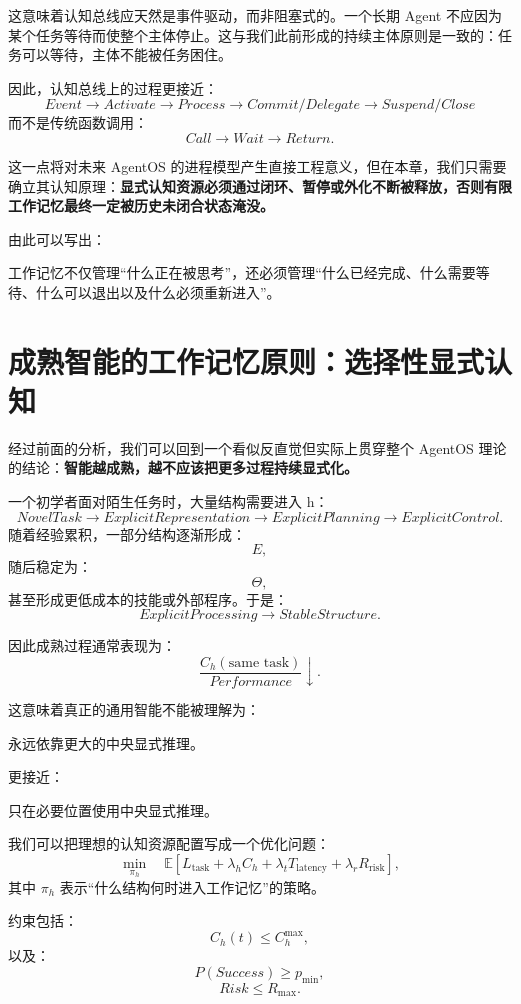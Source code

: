 这意味着认知总线应天然是事件驱动，而非阻塞式的。一个长期 Agent 不应因为某个任务等待而使整个主体停止。这与我们此前形成的持续主体原则是一致的：任务可以等待，主体不能被任务困住。

因此，认知总线上的过程更接近：
\[
Event
\rightarrow
Activate
\rightarrow
Process
\rightarrow
Commit/Delegate
\rightarrow
Suspend/Close
\]
而不是传统函数调用：
\[
Call
\rightarrow
Wait
\rightarrow
Return.
\]

这一点将对未来 AgentOS 的进程模型产生直接工程意义，但在本章，我们只需要确立其认知原理：\textbf{显式认知资源必须通过闭环、暂停或外化不断被释放，否则有限工作记忆最终一定被历史未闭合状态淹没。}

由此可以写出：
\begin{statementbox}
工作记忆不仅管理“什么正在被思考”，还必须管理“什么已经完成、什么需要等待、什么可以退出以及什么必须重新进入”。
\end{statementbox}

\section{成熟智能的工作记忆原则：选择性显式认知}

经过前面的分析，我们可以回到一个看似反直觉但实际上贯穿整个 AgentOS 理论的结论：\textbf{智能越成熟，越不应该把更多过程持续显式化。}

一个初学者面对陌生任务时，大量结构需要进入 h：
\[
NovelTask
\rightarrow
ExplicitRepresentation
\rightarrow
ExplicitPlanning
\rightarrow
ExplicitControl.
\]
随着经验累积，一部分结构逐渐形成：
\[
E,
\]
随后稳定为：
\[
\Theta,
\]
甚至形成更低成本的技能或外部程序。于是：
\[
ExplicitProcessing
\rightarrow
StableStructure.
\]

因此成熟过程通常表现为：
\[
\frac{C_h(\text{same task})}
{Performance}
\downarrow.
\]

这意味着真正的通用智能不能被理解为：
\begin{statementbox}
永远依靠更大的中央显式推理。
\end{statementbox}
更接近：
\begin{statementbox}
只在必要位置使用中央显式推理。
\end{statementbox}

我们可以把理想的认知资源配置写成一个优化问题：
\[
\min_{\pi_h}
\quad
\mathbb E
\left[
L_{\mathrm{task}}
+
\lambda_hC_h
+
\lambda_tT_{\mathrm{latency}}
+
\lambda_rR_{\mathrm{risk}}
\right],
\]
其中 $\pi_h$ 表示“什么结构何时进入工作记忆”的策略。

约束包括：
\[
C_h(t)\le C_h^{\max},
\]
以及：
\[
P(Success)\geq p_{\min},
\]
\[
Risk\leq R_{\max}.
\]

